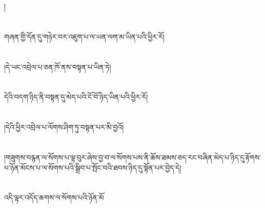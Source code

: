 །\chapter{ }གཞན་གྱི་དོན་དུ་གཉེར་བར་འཇུག་པ་ལ་ཡན་ལག་མ་ཡིན་པའི་ཕྱིར་རོ།\chapter{ }།དེ་ཡང་འབྲེལ་པ་ཅན་ཁོ་ནས་བསྟན་པ་ཡིན་ཏེ།\chapter{ }དེའི་བདག་ཉིད་ནི་བསྟན་དུ་མེད་པའི་ངོ་བོ་ཉིད་ཡིན་པའི་ཕྱིར་རོ།\chapter{ }།དེའི་ཕྱིར་འབྲེལ་པ་ལོགས་ཤིག་ཏུ་བསྟན་པར་མི་བྱའོ།\chapter{ }།གཟུགས་བརྙན་ལ་སོགས་པ་ལྟ་བུར་ཞེས་བྱ་བ་ལ་སོགས་པས་ནི་ཆོས་ཐམས་ཅད་རང་བཞིན་མེད་པ་ཉིད་དུ་རྟོགས་པ་ཉོན་མོངས་པ་ལ་སོགས་པའི་སྒྲིབ་པ་སྤོང་བའི་ཐབས་ཉིད་དུ་སྟོན་པར་བྱེད་དེ།\chapter{ }འདི་ལྟར་འདོད་ཆགས་ལ་སོགས་པའི་ཉོན་མོ